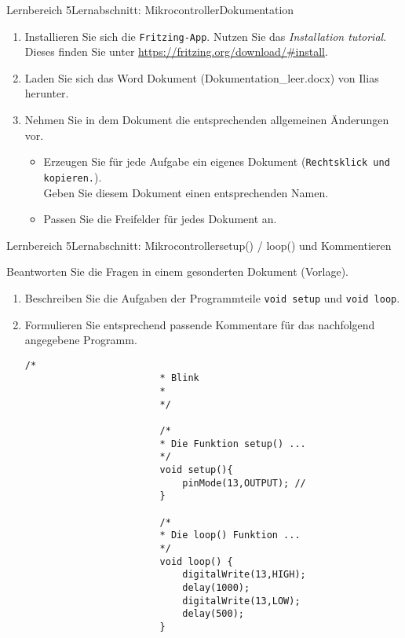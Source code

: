 \documentclass[oneside,openany,headings=optiontotoc,11pt,numbers=noenddot]{scrreprt}
\begin{document}
		\begin{worksheet}{Lernbereich 5}{Lernabschnitt: Mikrocontroller}{Dokumentation}
			\begin{framed}
				\noindent
				\renewcommand{\arraystretch}{1.5}
				\begin{enumerate}
					\item Installieren Sie sich die \texttt{Fritzing-App}. Nutzen Sie das \textit{Installation tutorial}.\\
					Dieses finden Sie unter \url{https://fritzing.org/download/#install}.
					\item Laden Sie sich das Word Dokument (Dokumentation\_leer.docx) von Ilias herunter.
					\item Nehmen Sie in dem Dokument die entsprechenden allgemeinen Änderungen vor.
					\begin{itemize}[label=+]
						\item Erzeugen Sie für jede Aufgabe ein eigenes Dokument (\texttt{Rechtsklick und kopieren.}).\\
						Geben Sie diesem Dokument einen entsprechenden Namen.
						\item Passen Sie die \grqq{}Freifelder\grqq{} für jedes Dokument an.
					\end{itemize}
				\end{enumerate}
			\end{framed}
		\end{worksheet}
		\begin{worksheet}{Lernbereich 5}{Lernabschnitt: Mikrocontroller}{setup() / loop() und Kommentieren}
			\begin{framed}
				\noindent
				Beantworten Sie die Fragen in einem gesonderten Dokument (Vorlage).
				\begin{enumerate}[label=(\Roman{*})]
					\item Beschreiben Sie die Aufgaben der Programmteile \lstinline[style=Arduino]|void setup| und \lstinline[style=Arduino]|void loop|.
					\item Formulieren Sie entsprechend passende Kommentare für das nachfolgend angegebene Programm.
					\begin{lstlisting}[style=Arduino]
						/*
						* Blink
						*
						*/
												
						/*
						* Die Funktion setup() ...
						*/
						void setup(){
							pinMode(13,OUTPUT); //
						}
						
						/*
						* Die loop() Funktion ...
						*/
						void loop() {
							digitalWrite(13,HIGH);
							delay(1000);
							digitalWrite(13,LOW);
							delay(500);
						}
					\end{lstlisting}
				\end{enumerate}
			\end{framed}
		\end{worksheet}
\end{document}

